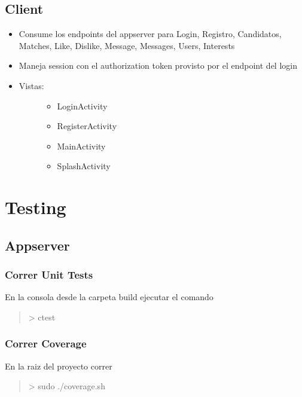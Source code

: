 \documentclass[letterpaper,10pt,english]{sphinxmanual}
\begin{document}
\subsection{Client}
\label{manuals:client}\begin{itemize}
\item {} 
Consume los endpoints del appserver para Login, Registro, Candidatos, Matches, Like, Dislike, Message, Messages, Users, Interests

\item {} 
Maneja session con el authorization token provisto por el endpoint del login

\item {} \begin{description}
\item[{Vistas:}] \leavevmode\begin{itemize}
\item {} 
LoginActivity

\item {} 
RegisterActivity

\item {} 
MainActivity

\item {} 
SplashActivity

\end{itemize}

\end{description}

\end{itemize}


\section{Testing}
\label{manuals:testing}

\subsection{Appserver}
\label{manuals:id1}

\subsubsection{Correr Unit Tests}
\label{manuals:correr-unit-tests}
En la consola desde la carpeta build ejecutar el comando
\begin{quote}

\textgreater{} ctest
\end{quote}


\subsubsection{Correr Coverage}
\label{manuals:correr-coverage}
En la raiz del proyecto correr
\begin{quote}

\textgreater{} sudo ./coverage.sh
\end{quote}
\end{document}
